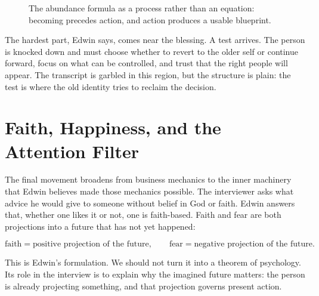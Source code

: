\begin{figure}
\centering
{}
\caption{The abundance formula as a process rather than an equation: becoming precedes action, and action produces a usable blueprint.}
\end{figure}

The hardest part, Edwin says, comes near the blessing. A test arrives. The person is knocked down and must choose whether to revert to the older self or continue forward, focus on what can be controlled, and trust that the right people will appear. The transcript is garbled in this region, but the structure is plain: the test is where the old identity tries to reclaim the decision.

\section{Faith, Happiness, and the Attention Filter}

The final movement broadens from business mechanics to the inner machinery that Edwin believes made those mechanics possible. The interviewer asks what advice he would give to someone without belief in God or faith. Edwin answers that, whether one likes it or not, one is faith-based. Faith and fear are both projections into a future that has not yet happened:

\begin{equation}
\text{faith}
=
\text{positive projection of the future},
\qquad
\text{fear}
=
\text{negative projection of the future}.
\end{equation}

This is Edwin's formulation. We should not turn it into a theorem of psychology. Its role in the interview is to explain why the imagined future matters: the person is already projecting something, and that projection governs present action.

